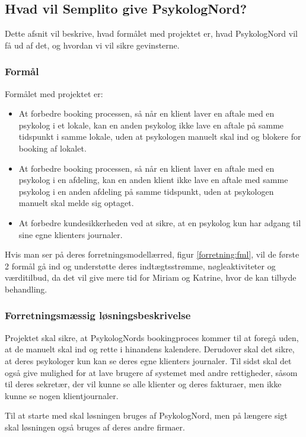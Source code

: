 \subsection{Hvad vil Semplito give PsykologNord?}
Dette afsnit vil beskrive, hvad formålet med projektet er, hvad PsykologNord vil få ud af det, og hvordan vi vil sikre gevinsterne.

\subsubsection{Formål}
Formålet med projektet er:

\begin{itemize}
    \item At forbedre booking processen, så når en klient laver en aftale med en psykolog i et lokale, kan en anden psykolog ikke lave en aftale på samme tidspunkt i samme lokale, uden at psykologen manuelt skal ind og blokere for booking af lokalet.
    \item At forbedre booking processen, så når en klient laver en aftale med en psykolog i en afdeling, kan en anden klient ikke lave en aftale med samme psykolog i en anden afdeling på samme tidspunkt, uden at psykologen manuelt skal melde sig optaget.
    \item At forbedre kundesikkerheden ved at sikre, at en psykolog kun har adgang til sine egne klienters journaler.
\end{itemize}

Hvis man ser på deres forretningsmodellærred, figur \ref{forretning:fml}, vil de første 2 formål gå ind og understøtte deres indtægtsstrømme, nøgleaktiviteter og værditilbud, da det vil give mere tid for Miriam og Katrine, hvor de kan tilbyde behandling.
\subsubsection{Forretningsmæssig løsningsbeskrivelse}

Projektet skal sikre, at PsykologNords bookingproces kommer til at foregå uden, at de manuelt skal ind og rette i hinandens kalendere.
Derudover skal det sikre, at deres psykologer kun kan se deres egne klienters journaler. 
Til sidst skal det også give mulighed for at lave brugere af systemet med andre rettigheder, såsom til deres sekretær, der vil kunne se alle klienter og deres fakturaer, men ikke kunne se nogen klientjournaler.

Til at starte med skal løsningen bruges af PsykologNord, men på længere sigt skal løsningen også bruges af deres andre firmaer.

